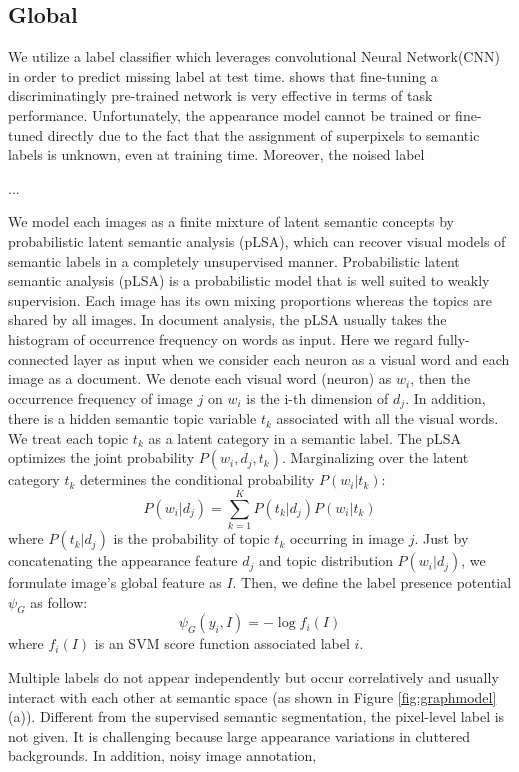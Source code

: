 \subsection{Global}
We utilize a label classifier which leverages convolutional Neural Network(CNN) in order to predict missing label at test time. \cite{agrawal2014analyzing} shows that fine-tuning a discriminatingly pre-trained network is very effective in terms of task performance. Unfortunately, the appearance model cannot be trained or fine-tuned directly due to the fact that the assignment of superpixels to semantic labels is unknown, even at training time. Moreover, the noised label

...

We model each images as a finite mixture of latent semantic concepts by probabilistic latent semantic analysis (pLSA), which can recover visual models of semantic labels  in a completely unsupervised manner. Probabilistic latent semantic analysis (pLSA) is a probabilistic model that is well suited to weakly supervision. Each image has its own mixing proportions whereas the topics are shared by all images. In document analysis, the pLSA usually takes the histogram of occurrence frequency on words as input. Here we regard fully-connected layer as input when we consider each neuron as a visual word and each image as a document. We denote each visual word (neuron) as $w_i$, then the occurrence frequency of image $j$ on $w_i$ is the i-th dimension of $d_j$. In addition, there is a hidden semantic topic variable $t_k$ associated with all the visual words. We treat each topic $t_k$ as a latent category in a semantic label. The pLSA optimizes the joint probability $P(w_i,d_j,t_k)$. Marginalizing over the latent category $t_k$ determines the conditional probability $P(w_i|t_k)$:
\begin{equation}
  P(w_i|d_j) = \sum_{k=1}^K{P(t_k|d_j)P(w_i|t_k)}
\end{equation}
where $P(t_k|d_j)$ is the probability of topic $t_k$ occurring in image $j$.
Just by concatenating the appearance feature $d_j$ and topic distribution $P(w_i|d_j)$, we formulate image's global feature as $I$. Then, we define the label presence potential $\psi_{G}$ as follow:
\begin{equation}
    \psi_{G}(y_i,I) = -\log f_{i}(I)
\end{equation}
where $f_{i}(I)$ is an SVM score function associated label $i$.

Multiple labels do not appear independently but occur correlatively and usually interact with each other at semantic space (as shown in Figure \ref{fig:graphmodel} (a)). Different from the supervised semantic segmentation, the pixel-level label is not given. It is challenging because large appearance variations in cluttered backgrounds. In addition, noisy image annotation,

